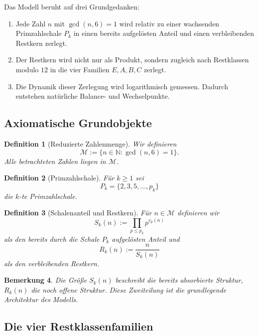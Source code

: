 \documentclass[11pt,a4paper]{article}
\newtheorem{definition}{Definition}[section]
\newtheorem{bemerkung}[definition]{Bemerkung}
\begin{document}
	Das Modell beruht auf drei Grundgedanken:
	
	\begin{enumerate}
		\item Jede Zahl \(n\) mit \(\gcd(n,6)=1\) wird relativ zu einer wachsenden Primzahlschale \(P_k\) in einen bereits aufgelösten Anteil und einen verbleibenden Restkern zerlegt.
		\item Der Restkern wird nicht nur als Produkt, sondern zugleich nach Restklassen modulo \(12\) in die vier Familien \(E,A,B,C\) zerlegt.
		\item Die Dynamik dieser Zerlegung wird logarithmisch gemessen. Dadurch entstehen natürliche Balance- und Wechselpunkte.
	\end{enumerate}
	
	\subsection{Axiomatische Grundobjekte}
	
	\begin{definition}[Reduzierte Zahlenmenge]
		\label{def:modell_M}
		Wir definieren
		\[
		\mathcal M:=\{n\in\mathbb N:\gcd(n,6)=1\}.
		\]
		Alle betrachteten Zahlen liegen in \(\mathcal M\).
	\end{definition}
	
	\begin{definition}[Primzahlschale]
		\label{def:modell_pk}
		Für \(k\ge 1\) sei
		\[
		P_k=\{2,3,5,\dots,p_k\}
		\]
		die \(k\)-te Primzahlschale.
	\end{definition}
	
	\begin{definition}[Schalenanteil und Restkern]
		\label{def:modell_sk_rk}
		Für \(n\in\mathcal M\) definieren wir
		\[
		S_k(n):=\prod_{p\le p_k} p^{v_p(n)}
		\]
		als den bereits durch die Schale \(P_k\) aufgelösten Anteil und
		\[
		R_k(n):=\frac{n}{S_k(n)}
		\]
		als den verbleibenden Restkern.
	\end{definition}
	
	\begin{bemerkung}
		Die Größe \(S_k(n)\) beschreibt die bereits absorbierte Struktur, \(R_k(n)\) die noch offene Struktur. Diese Zweiteilung ist die grundlegende Architektur des Modells.
	\end{bemerkung}
	
	\subsection{Die vier Restklassenfamilien}
	
\end{document}
